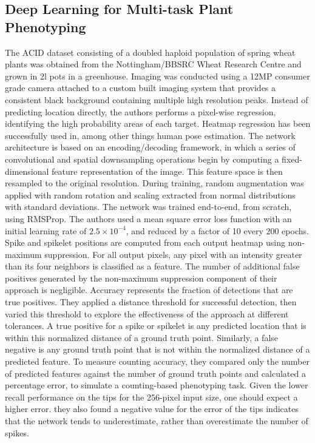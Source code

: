 \subsection{Deep Learning for Multi-task Plant Phenotyping}
The ACID dataset\cite{multitask} consisting of a doubled haploid population of spring wheat plants was obtained from the Nottingham/BBSRC
Wheat Research Centre and grown in 2l pots in a greenhouse. Imaging was conducted using a 12MP consumer grade camera attached to a custom built imaging system
that provides a consistent black background containing multiple high resolution peaks. Instead of predicting location directly, the authors performs a pixel-wise regression,
identifying the high probability areas of each target. Heatmap regression has been successfully used in, among other things human pose estimation. The network
architecture is based on an encoding/decoding framework, in which a series of convolutional and spatial downsampling operations begin by computing a fixed-dimensional
feature representation of the image. This feature space is then resampled to the original resolution. During training, random augmentation was applied with random
rotation and scaling extracted from normal distributions with standard deviations. The network was trained end-to-end, from scratch, using RMSProp. The authors used
a mean square error loss function with an initial learning rate of $2.5\times 10^{-4}$, and reduced by a factor of 10 every 200 epochs. Spike and spikelet positions
are computed from each output heatmap using non-maximum suppression. For all output pixels, any pixel with an intensity greater than its four neighbors is classified
as a feature. The number of additional false positives generated by the non-maximum suppression component of their approach is negligible. Accuracy represents the
fraction of detections that are true positives. They applied a distance threshold for successful detection, then varied this threshold to explore the effectiveness
of the approach at different tolerances. A true positive for a spike or spikelet is any predicted location that is within this normalized distance of a ground truth
point. Similarly, a false negative is any ground truth point that is not within the normalized distance of a predicted feature. To measure counting accuracy, they
compared only the number of predicted features against the number of ground truth points and calculated a percentage error, to simulate a counting-based phenotyping
task. Given the lower recall performance on the tips for the 256-pixel input size, one should expect a higher error. they also found a negative value for the error
of the tips indicates that the network tends to underestimate, rather than overestimate the number of spikes.









